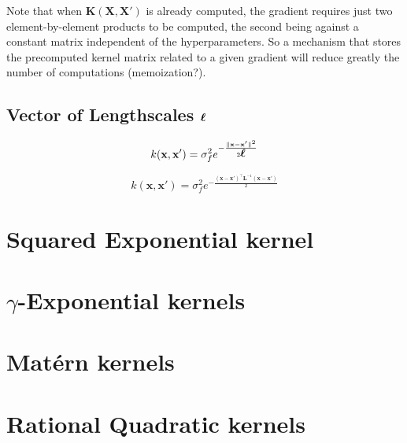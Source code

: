 \documentclass[a4paper,11pt]{article}
\newcommand\x{{\mathbf x}}
\newcommand\X{{\mathbf X}}
\newcommand\K{{\mathbf K}}
\newcommand{\Ivec}[1]{\mbox{\boldmath $#1$}}
\begin{document}
Note that when $\K(\X,\X')$ is already computed, the gradient requires
just two element-by-element products to be computed, the second being
against a constant matrix independent of the hyperparameters. So a
mechanism that stores the precomputed kernel matrix related to a given
gradient will reduce greatly the number of computations
(memoization?).

\subsection{Vector of Lengthscales $\Ivec{\ell}$}
$$k(\x,\x') = \sigma_f^2 e^{-\frac{\|\x-\x'\|^2}{2\Ivec{\ell}}}$$



$$k(\x,\x') = \sigma_f^2 e^{-\frac{(\x-\x')^{\top} \mathbf{L}^{-1} (\x-\x')}{2}}$$


\section{Squared Exponential kernel}

\section{$\gamma$-Exponential kernels}

\section{Mat\'ern kernels}

\section{Rational Quadratic kernels}
\end{document}
